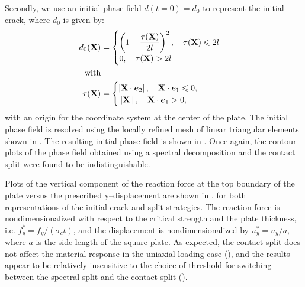 

Secondly, we use an initial phase field $d(t = 0) = d_0$ to represent the initial crack, where $d_0$ is given by:
\begin{align}
  d_0(\textbf{X})   & =                                            
  \begin{cases}
    \left( 1-\dfrac{\tau(\textbf{X})}{2l} \right)^2, \quad \tau(\textbf{X}) \leqslant 2l \\
    0, \quad  \tau(\textbf{X}) > 2l
  \end{cases} \label{eq: mode1 initial damage} \\
  \mbox{with} &                                              \\
  \tau(\textbf{X})  & =                                            
  \begin{cases}
    \left\vert \textbf{X}\cdot\boldsymbol{e}_2 \right\vert, \quad \textbf{X}\cdot\boldsymbol{e}_1 \leqslant 0, \\
    \left\lVert\textbf{X}\right\rVert, \quad \textbf{X}\cdot\boldsymbol{e}_1 > 0,
  \end{cases}
\end{align}
with an origin for the coordinate system at the center of the plate. The initial phase field is resolved using the locally refined mesh of linear triangular elements shown in . The resulting initial phase field is shown in .  Once again, the contour plots of the phase field obtained using a spectral decomposition and the contact split were found to be indistinguishable.



Plots of the vertical component of the reaction force at the top boundary of the plate versus the prescribed y--displacement are shown in , for both representations of the initial crack and split strategies.  The reaction force is nondimensionalized with respect to the critical strength and the plate thickness, i.e. $f_y^* = f_y / (\sigma_c t)$, and the displacement is nondimensionalized by $u_y^* = u_y / a$, where $a$ is the side length of the square plate.  As expected, the contact split does not affect the material response in the uniaxial loading case (), and the results appear to be relatively insensitive to the choice of threshold for switching between the spectral split and the contact split ().

